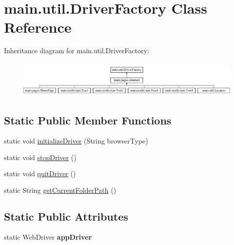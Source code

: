 \hypertarget{classmain_1_1util_1_1_driver_factory}{}\section{main.\+util.\+Driver\+Factory Class Reference}
\label{classmain_1_1util_1_1_driver_factory}
Inheritance diagram for main.\+util.\+Driver\+Factory\+:\begin{figure}[H]
\begin{center}
\leavevmode
\includegraphics[height=1.866667cm]{classmain_1_1util_1_1_driver_factory}
\end{center}
\end{figure}
\subsection*{Static Public Member Functions}
\begin{DoxyCompactItemize}
\item 
static void \mbox{\hyperlink{classmain_1_1util_1_1_driver_factory_a0e334a84a12fdd821fc19df6bb29241e}{initialize\+Driver}} (String browser\+Type)
\item 
static void \mbox{\hyperlink{classmain_1_1util_1_1_driver_factory_abdd3d0a38b3fa5faa46119170c124518}{stop\+Driver}} ()
\item 
static void \mbox{\hyperlink{classmain_1_1util_1_1_driver_factory_a8e5bfb00afc1564bf60ec2491953ad42}{quit\+Driver}} ()
\item 
static String \mbox{\hyperlink{classmain_1_1util_1_1_driver_factory_a31b83afd40c9f0a7d24661ccbce90d83}{get\+Current\+Folder\+Path}} ()
\end{DoxyCompactItemize}
\subsection*{Static Public Attributes}
\begin{DoxyCompactItemize}
\item 
\mbox{\label{classmain_1_1util_1_1_driver_factory_a8afca6d6beb8c3486a6fd673d19ea79b}} 
static Web\+Driver {\bfseries app\+Driver}
\end{DoxyCompactItemize}


